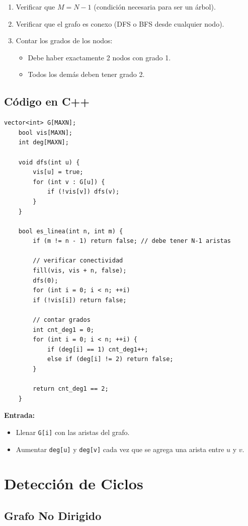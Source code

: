 \begin{enumerate}
	\item Verificar que \( M = N - 1 \) (condición necesaria para ser un árbol).
	\item Verificar que el grafo es conexo (DFS o BFS desde cualquier nodo).
	\item Contar los grados de los nodos:
	\begin{itemize}
		\item Debe haber exactamente 2 nodos con grado 1.
		\item Todos los demás deben tener grado 2.
	\end{itemize}
\end{enumerate}

\subsection*{Código en C++}

\begin{lstlisting}[caption=Verificar si un grafo es una línea]
	vector<int> G[MAXN];
	bool vis[MAXN];
	int deg[MAXN];
	
	void dfs(int u) {
		vis[u] = true;
		for (int v : G[u]) {
			if (!vis[v]) dfs(v);
		}
	}
	
	bool es_linea(int n, int m) {
		if (m != n - 1) return false; // debe tener N-1 aristas
		
		// verificar conectividad
		fill(vis, vis + n, false);
		dfs(0);
		for (int i = 0; i < n; ++i)
		if (!vis[i]) return false;
		
		// contar grados
		int cnt_deg1 = 0;
		for (int i = 0; i < n; ++i) {
			if (deg[i] == 1) cnt_deg1++;
			else if (deg[i] != 2) return false;
		}
		
		return cnt_deg1 == 2;
	}
\end{lstlisting}

\textbf{Entrada:}
\begin{itemize}
	\item Llenar \texttt{G[i]} con las aristas del grafo.
	\item Aumentar \texttt{deg[u]} y \texttt{deg[v]} cada vez que se agrega una arista entre \( u \) y \( v \).
\end{itemize}
		
\section{Detección de Ciclos}

\subsection{Grafo No Dirigido}

